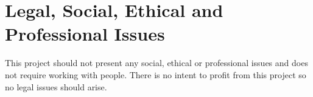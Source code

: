 \documentclass[a4paper,fleqn,12pt]{article}
\begin{document}
	\section{Legal, Social, Ethical and Professional Issues}
	This project should not present any social, ethical or professional issues and does not require working with people. There is no intent to profit from this project so no legal issues should arise.
	
	\newpage
	
	
	
\end{document}
